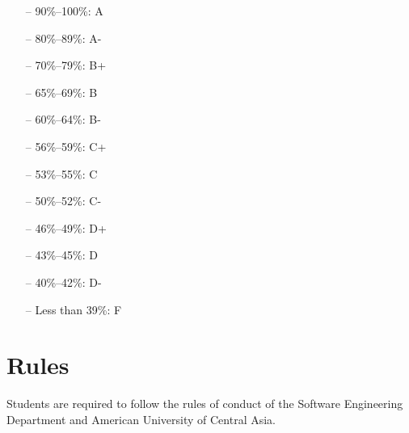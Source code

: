 \documentclass[12pt,a4paper,oneside]{article}
\begin{document}
        \newpage

        \begin{itemize} \itemsep-10pt \parskip0pt 
            \item[--] 90\%--100\%: A\\
            \item[--] 80\%--89\%: A-\\
            \item[--] 70\%--79\%: B+\\
            \item[--] 65\%--69\%: B\\
            \item[--] 60\%--64\%: B-\\
            \item[--] 56\%--59\%: C+\\
            \item[--] 53\%--55\%: C\\
            \item[--] 50\%--52\%: C-\\
            \item[--] 46\%--49\%: D+\\
            \item[--] 43\%--45\%: D\\
            \item[--] 40\%--42\%: D-\\
            \item[--] Less than 39\%: F
        \end{itemize}

    \section{Rules}

        Students are required to follow the rules of conduct of the Software Engineering Department and American University of Central Asia.
\end{document}
